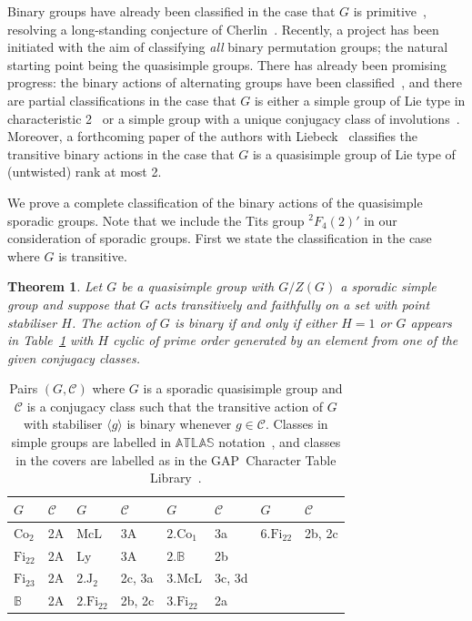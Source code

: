 \documentclass[11pt, a4paper]{amsart}
\newcommand\C{\mathcal{C}}
\newcommand{\gap}{{\sf GAP}}
\newtheorem{thm}{Theorem}[section]  \newtheorem{lemma}[thm]{Lemma}     \newtheorem{cor}[thm]{Corollary}
\begin{document}
Binary groups have already been classified in the case that $G$ is primitive~\cite{GLS22}, resolving a long-standing conjecture of Cherlin~\cite{cherlin2000}. Recently, a project has been initiated with the aim of classifying \emph{all} binary permutation groups; the natural starting point being the quasisimple groups. There has already been promising progress: the binary actions of alternating groups have been classified~\cite{GG23}, and there are partial classifications in the case that $G$ is either a simple group of Lie type in characteristic 2~\cite{GGL25} or a simple group with a unique conjugacy class of involutions~\cite{GG25}. Moreover, a forthcoming paper of the authors with Liebeck~\cite{dVGL26} classifies the transitive binary actions in the case that $G$ is a quasisimple group of Lie type of (untwisted) rank at most 2.

We prove a complete classification of the binary actions of the quasisimple sporadic groups. Note that we include the Tits group ${}^2F_4(2)'$ in our consideration of sporadic groups. First we state the classification in the case where $G$ is transitive.

\begin{thm}\label{thm:maintrans}
    Let $G$ be a quasisimple group with $G/Z(G)$ a sporadic simple group and suppose that $G$ acts transitively and faithfully on a set with point stabiliser $H$. The action of $G$ is binary if and only if either $H=1$ or $G$ appears in Table~\ref{tbl:transall} with $H$ cyclic of prime order generated by an element from one of the given conjugacy classes.
\end{thm}

\begin{table}[h]
\begin{tabular}{|ll|ll|ll|ll|}
\hline
$G$                & $\C$ & $G$                  & $\C$   & $G$                  & $\C$  & $G$                  & $\C$  \\ \hline
$\mathrm{Co}_2$    & 2A   & $\mathrm{McL}$       & 3A     & $2.\mathrm{Co}_1$    & 3a    & $6.\mathrm{Fi}_{22}$ & 2b, 2c \\ \hline
$\mathrm{Fi}_{22}$ & 2A   & $\mathrm{Ly}$        & 3A     & $2.\mathbb{B}$       & 2b    &                      &       \\ \hline
$\mathrm{Fi}_{23}$ & 2A   & $2.\mathrm{J}_2$     & 2c, 3a  & $3.\mathrm{McL}$     & 3c, 3d &                      &       \\ \hline
$\mathbb{B}$       & 2A   & $2.\mathrm{Fi}_{22}$ & 2b, 2c & $3.\mathrm{Fi}_{22}$ & 2a    &                      &       \\ \hline
\end{tabular}
\caption{Pairs $(G,\C)$ where $G$ is a sporadic quasisimple group and $\C$ is a conjugacy class such that the transitive action of $G$ with stabiliser $\langle g\rangle$ is binary whenever $g\in \C$. Classes in simple groups are labelled in $\mathbb{ATLAS}$ notation~\cite{atlas}, and classes in the covers are labelled as in the \gap~Character Table Library~\cite{CTblLib1.3.11}.}
\label{tbl:transall}
\end{table}
\end{document}
